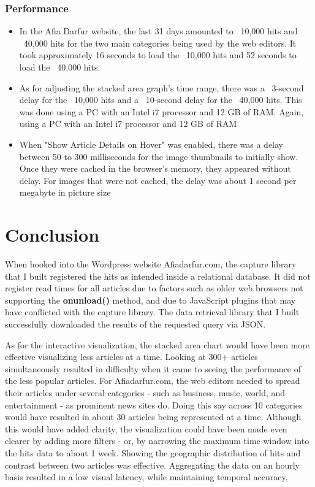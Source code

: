 \documentclass[12pt]{article}
\begin{document}
\subsubsection{Performance}
\begin{itemize}
\item In the Afia Darfur website, the last 31 days amounted to ~10,000 hits and ~40,000 hits for the two main categories being used by the web editors. It took approximately 16 seconds to load the ~10,000 hits and 52 seconds to load the ~40,000 hits. 
\item As for adjusting the stacked area graph's time range, there was a ~3-second delay for the ~10,000 hits and a ~10-second delay for the ~40,000 hits. This was done using a PC with an Intel i7 processor and 12 GB of RAM. Again, using a PC with an Intel i7 processor and 12 GB of RAM
\item When "Show Article Details on Hover" was enabled, there was a delay between 50 to 300 milliseconds for the image thumbnails to initially show. Once they were cached in the browser's memory, they appeared without delay. For images that were not cached, the delay was about 1 second per megabyte in picture size
\end{itemize}

\section{Conclusion}
When hooked into the Wordpress website Afiadarfur.com, the capture library that I built registered the hits as intended inside a relational database. It did not register read times for all articles due to factors such as older web browsers not supporting the \textbf{onunload()} method, and due to JavaScript plugins that may have conflicted with the capture library. The data retrieval library that I built successfully downloaded the results of the requested query via JSON. 

As for the interactive visualization, the stacked area chart would have been more effective visualizing less articles at a time. Looking at 300+ articles simultaneously resulted in difficulty when it came to seeing the performance of the less popular articles. For Afiadarfur.com, the web editors needed to spread their articles under several categories - such as business, music, world, and entertainment - as prominent news sites do. Doing this say across 10 categories would have resulted in about 30 articles being represented at a time. Although this would have added clarity, the visualization could have been made even clearer by adding more filters - or, by narrowing the maximum time window into the hits data to about 1 week. Showing the geographic distribution of hits and contrast between two articles was effective. Aggregating the data on an hourly basis resulted in a low visual latency, while maintaining temporal accuracy. 
\end{document}
